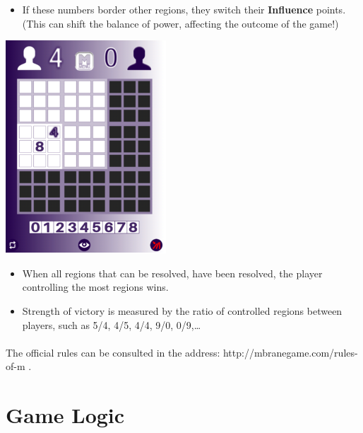\documentclass[a4paper]{article}
\begin{document}
\begin{itemize}
    \item If these numbers border other regions, they switch their \textbf{Influence} points. (This can shift the balance of power, 
    affecting the outcome of the game!)
\end{itemize}
\begin{center}
    \includegraphics[scale=0.5]{img/tutorial_6.png}
\end{center}

\begin{itemize}
    \item When all regions that can be resolved, have been resolved, the player controlling the most regions wins.
    \item Strength of victory is measured by the ratio of controlled regions between players, such as 5/4, 4/5, 4/4, 9/0, 0/9,\ldots
\end{itemize}

\paragraph{}
The official rules can be consulted in the address: http://mbranegame.com/rules-of-m \cite{Rules}.

\pagebreak
\section{Game Logic}

\end{document}
